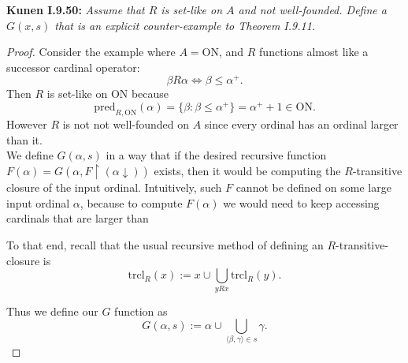 \documentclass{article}
\begin{document}
\textbf{Kunen I.9.50:} \it Assume that $R$ is set-like on $A$ and not
  well-founded. Define a $G(x,s)$ that is an explicit counter-example to
  Theorem I.9.11.

  \begin{proof}
    Consider the example where $A=\text{ON}$, and $R$ functions almost like
    a successor cardinal operator:
    \[\beta R\alpha \Leftrightarrow \beta\leq\alpha^+.\]
    Then $R$ is set-like on ON because
    \[\text{pred}_{R,\text{ON}}(\alpha) =\{\beta: \beta\leq\alpha^+\}
    =\alpha^++1\in\text{ON}.\]
    However $R$ is not not well-founded on $A$ since every ordinal has an
    ordinal larger than it. \\

    We define $G(\alpha,s)$ in a way that if the desired recursive function
    $F(\alpha) =G(\alpha, F\restriction(\alpha\downarrow))$ exists, then it
    would be computing the $R$-transitive closure of the input ordinal.
    Intuitively, such $F$ cannot be defined on some large input ordinal
    $\alpha$, because to compute $F(\alpha)$ we would need to keep
    accessing cardinals that are larger than 

    To
    that end, recall that the usual recursive method of defining an
    $R$-transitive-closure is
    \[\text{trcl}_R(x) :=x \cup \bigcup_{yRx} \text{trcl}_R(y).\]

    Thus we define our $G$ function as 
    \[G(\alpha,s) :=\alpha \cup \bigcup_{\langle \beta,\gamma\rangle \in s}
    \gamma.\]
  \end{proof}
\end{document}
